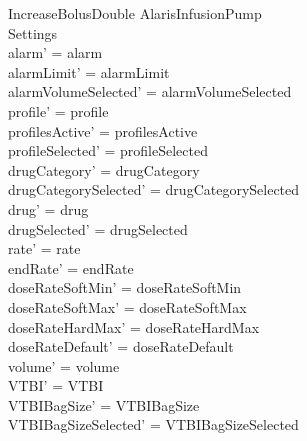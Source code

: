 \begin{schema}{IncreaseBolusDouble}
\pagebreak
	\Delta AlarisInfusionPump\\
	
	Settings\\
	\where
	alarm' = alarm\\
	alarmLimit' = alarmLimit\\
	alarmVolumeSelected' = alarmVolumeSelected\\
	profile' = profile\\
	profilesActive' = profilesActive\\  
	  profileSelected' = profileSelected\\
	drugCategory' = drugCategory\\ drugCategorySelected' = drugCategorySelected\\
	drug' = drug\\ drugSelected' = drugSelected\\
	rate' = rate\\
	endRate' = endRate\\
	doseRateSoftMin' = doseRateSoftMin\\
	doseRateSoftMax' = doseRateSoftMax\\
	doseRateHardMax' = doseRateHardMax\\
	doseRateDefault' = doseRateDefault\\
	volume' = volume\\
	VTBI' = VTBI\\
	VTBIBagSize' = VTBIBagSize\\ VTBIBagSizeSelected' = VTBIBagSizeSelected\\

\end{schema}
